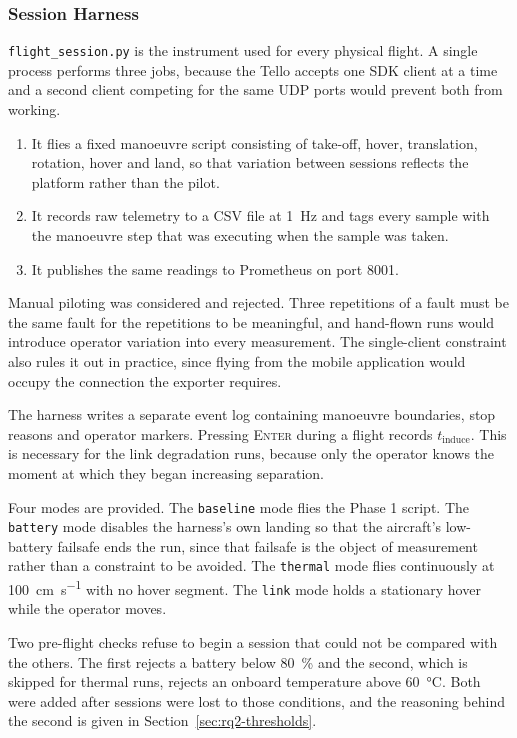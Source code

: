 \subsubsection{Session Harness}\label{sec:rq2-harness}

\texttt{flight\_session.py} is the instrument used for every physical flight. A
single process performs three jobs, because the Tello accepts one SDK client at
a time and a second client competing for the same UDP ports would prevent both
from working.

\begin{enumerate}
    \item It flies a fixed manoeuvre script consisting of take-off, hover,
    translation, rotation, hover and land, so that variation between sessions
    reflects the platform rather than the pilot.
    \item It records raw telemetry to a CSV file at \SI{1}{\hertz} and tags
    every sample with the manoeuvre step that was executing when the sample was
    taken.
    \item It publishes the same readings to Prometheus on port 8001.
\end{enumerate}

Manual piloting was considered and rejected. Three repetitions of a fault must
be the same fault for the repetitions to be meaningful, and hand-flown runs
would introduce operator variation into every measurement. The single-client
constraint also rules it out in practice, since flying from the mobile
application would occupy the connection the exporter requires.

The harness writes a separate event log containing manoeuvre boundaries, stop
reasons and operator markers. Pressing \textsc{Enter} during a flight records
$t_{\text{induce}}$. This is necessary for the link degradation runs, because
only the operator knows the moment at which they began increasing separation.

Four modes are provided. The \texttt{baseline} mode flies the Phase 1 script.
The \texttt{battery} mode disables the harness's own landing so that the
aircraft's low-battery failsafe ends the run, since that failsafe is the object
of measurement rather than a constraint to be avoided. The \texttt{thermal} mode
flies continuously at \SI{100}{\centi\metre\per\second} with no hover segment.
The \texttt{link} mode holds a stationary hover while the operator moves.

Two pre-flight checks refuse to begin a session that could not be compared with
the others. The first rejects a battery below \SI{80}{\percent} and the second,
which is skipped for thermal runs, rejects an onboard temperature above
\SI{60}{\celsius}. Both were added after sessions were lost to those conditions,
and the reasoning behind the second is given in Section~\ref{sec:rq2-thresholds}.

